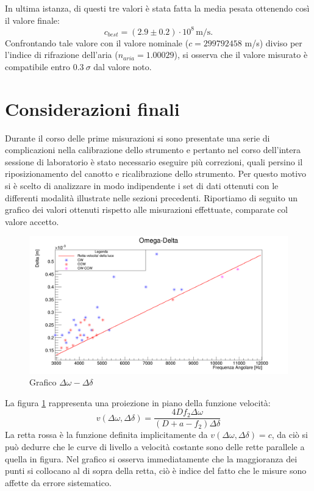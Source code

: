 \documentclass{article}
\begin{document}
        In ultima istanza, di questi tre valori  è stata fatta la media pesata ottenendo così il valore finale: 
        \[ c_{best} = (2.9 \pm 0.2)\cdot10^8 \, \mathrm{m/s}. \]
        Confrontando tale valore con il valore nominale ($ c = 299 792 458$ m/s) diviso per l'indice di rifrazione dell'aria ($ n_{aria} = 1.00029$), 
        si osserva che il valore misurato è compatibile entro $0.3 ~\sigma$ dal valore noto. 

    \newpage


    \section{Considerazioni finali}

        Durante il corso delle prime misurazioni si sono presentate una serie di complicazioni nella calibrazione dello strumento e 
        pertanto nel corso dell'intera sessione di laboratorio è stato necessario eseguire più correzioni, quali persino il riposizionamento del canotto e 
        ricalibrazione dello strumento. Per questo motivo si è scelto di analizzare in modo indipendente i set di dati ottenuti con le differenti modalità illustrate 
        nelle sezioni precedenti. Riportiamo di seguito un grafico dei valori ottenuti rispetto alle misurazioni effettuate, comparate col valore accetto.
            
        \begin{figure}[H]
            \centering
            \includegraphics[scale=0.32]{../images/omega_delta1.png}
            \caption{Grafico $\Delta\omega-\Delta\delta$}
            \label{fig:Omega-Delta}
        \end{figure}
        
        La figura \ref{fig:Omega-Delta} rappresenta una proiezione in piano della funzione velocità:
        \[ v(\Delta \omega,\Delta \delta)= \frac{4Df_2\Delta\omega}{(D+a-f_2)\Delta\delta} \]
        La retta {\color{Red}rossa} è la funzione definita implicitamente da $v(\Delta \omega,\Delta \delta)= c$, da ciò si può dedurre che 
        le curve di livello a velocità costante sono delle rette parallele a quella in figura. 
        Nel grafico si osserva immediatamente che la maggioranza dei punti si collocano al di sopra della retta, 
        ciò è indice del fatto che le misure sono affette da errore sistematico.
\end{document}
